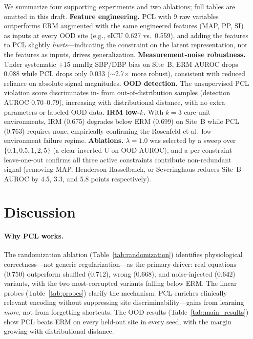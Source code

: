 \documentclass{article}
\begin{document}
We summarize four supporting experiments and two ablations; full tables are omitted in this draft.
\textbf{Feature engineering.} PCL with 9 raw variables outperforms ERM augmented with the same engineered features (MAP, PP, SI) as inputs at every OOD site (e.g., eICU 0.627 vs.\ 0.559), and adding the features to PCL slightly \emph{hurts}---indicating the constraint on the latent representation, not the features as inputs, drives generalization.
\textbf{Measurement-noise robustness.} Under systematic $\pm$15 mmHg SBP/DBP bias on Site~B, ERM AUROC drops 0.088 while PCL drops only 0.033 ($\sim$2.7$\times$ more robust), consistent with reduced reliance on absolute signal magnitudes.
\textbf{OOD detection.} The unsupervised PCL violation score discriminates in- from out-of-distribution samples (detection AUROC 0.70--0.79), increasing with distributional distance, with no extra parameters or labeled OOD data.
\textbf{IRM low-$k$.} With $k{=}3$ care-unit environments, IRM (0.675) degrades below ERM (0.699) on Site~B while PCL (0.763) requires none, empirically confirming the Rosenfeld et al.\ low-environment failure regime.
\textbf{Ablations.} $\lambda{=}1.0$ was selected by a sweep over $\{0.1,0.5,1,2,5\}$ (a clear inverted-U on OOD AUROC), and a per-constraint leave-one-out confirms all three active constraints contribute non-redundant signal (removing MAP, Henderson-Hasselbalch, or Severinghaus reduces Site~B AUROC by 4.5, 3.3, and 5.8 points respectively).

\section{Discussion}
\label{sec:discussion}

\paragraph{Why PCL works.}
The randomization ablation (Table~\ref{tab:randomization}) identifies physiological correctness---not generic regularization---as the primary driver: real equations (0.750) outperform shuffled (0.712), wrong (0.668), and noise-injected (0.642) variants, with the two most-corrupted variants falling below ERM.
The linear probes (Table~\ref{tab:probes}) clarify the mechanism: PCL enriches clinically relevant encoding without suppressing site discriminability---gains from learning \emph{more}, not from forgetting shortcuts.
The OOD results (Table~\ref{tab:main_results}) show PCL beats ERM on every held-out site in every seed, with the margin growing with distributional distance.
\end{document}

